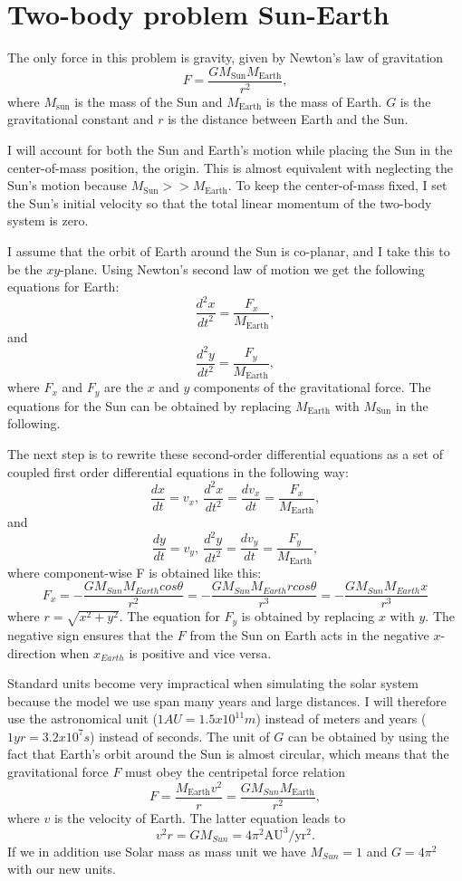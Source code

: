 \documentclass[a4paper,12pt, english]{article}
\begin{document}
\section*{Two-body problem Sun-Earth}

The only force in this problem is gravity, given by Newton's law of gravitation
\[
F=\frac{GM_{\mathrm{Sun}}M_{\mathrm{Earth}}}{r^2},
\]
where $M_{\mathrm{sun}}$ is the mass of the Sun and $M_{\mathrm{Earth}}$ is the mass of Earth. $G$ is the gravitational constant and $r$ is the distance between Earth and the Sun.

I will account for both the Sun and Earth's motion while placing the Sun in the center-of-mass position, the origin. This is almost equivalent with neglecting the Sun's motion because $M_{\mathrm{Sun}} >> M_{\mathrm{Earth}}$. To keep the center-of-mass fixed, I set the Sun's initial velocity so that the total linear momentum of the two-body system is zero.

I assume that the orbit of Earth around the Sun is co-planar, and I take this to be the $xy$-plane. Using Newton's second law of motion we get the following equations for Earth:
\[
\frac{d^2x}{dt^2}=\frac{F_x}{M_{\mathrm{Earth}}},
\]
and 
\[
\frac{d^2y}{dt^2}=\frac{F_y}{M_{\mathrm{Earth}}},
\]
where $F_x$ and $F_y$ are the $x$ and $y$ components of the gravitational force. The equations for the Sun can be obtained by replacing $M_{\mathrm{Earth}}$ with $M_{\mathrm{Sun}}$ in the following. 

The next step is to rewrite these second-order differential equations as a set of coupled first order differential equations in the following way:
\[
\frac{dx}{dt}=v_x, \ \frac{d^2x}{dt^2}=\frac{dv_x}{dt}=\frac{F_x}{M_{\mathrm{Earth}}},
\]
and
\[
\frac{dy}{dt}=v_y, \ \frac{d^2y}{dt^2}=\frac{dv_y}{dt}=\frac{F_y}{M_{\mathrm{Earth}}},
\]
where component-wise F is obtained like this:
\[
F_x = -\frac{GM_{Sun}M_{Earth}cos\theta}{r^2} = -\frac{GM_{Sun}M_{Earth}rcos\theta}{r^3} = 
-\frac{GM_{Sun}M_{Earth}x}{r^3}
\]
where $r=\sqrt{x^2+y^2}$. The equation for $F_y$ is obtained by replacing $x$ with $y$. The negative sign ensures that the $F$ from the Sun on Earth acts in the negative $x$-direction when $x_{Earth}$ is positive and vice versa.

Standard units become very impractical when simulating the solar system because the model we use span many years and large distances. I will therefore use the astronomical unit 
($1 AU = 1.5x10^{11} m$) instead of meters and years ($1 yr = 3.2x10^7 s$) instead of seconds.
The unit of $G$ can be obtained by using the fact that Earth's orbit around the Sun is almost circular, which means that the gravitational force $F$ must obey the centripetal force relation
\[
F = \frac{M_{\mathrm{Earth}}v^2}{r}=\frac{GM_{Sun}M_{\mathrm{Earth}}}{r^2},
\]
where $v$ is the velocity of Earth. The latter equation leads to
\[
v^2r=GM_{Sun}=4\pi^2\mathrm{AU}^3/\mathrm{yr}^2.
\]
If we in addition use Solar mass as mass unit we have $M_{Sun} = 1$ and 
$G = 4\pi^2$ with our new units. 
\end{document}
